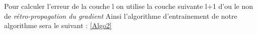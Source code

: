  Pour calculer l'erreur de la couche l on utilise la couche suivante l+1 d'ou le  non de \emph{rétro-propagation du gradient  }
 Ainsi l'algorithme d'entrainement de notre algorithme sera le suivant :
 \ref{Algo2}
 
